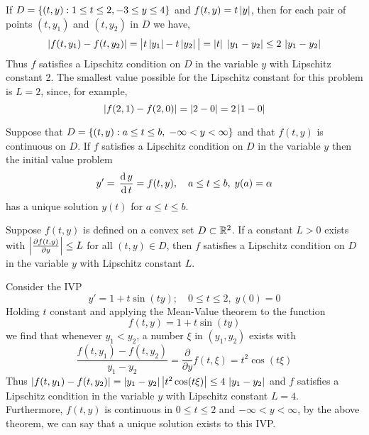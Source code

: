 \documentclass[../main-sheet.tex]{subfiles}
\begin{document}
\begin{ex}
    If \(D=\left\{(t,y):1\leq t\leq 2, -3\leq y\leq 4\right\}\) and \(f(t,y)=t\left\vert y\right\vert\), then for each pair of points \((t,y_1)\) and \((t,y_2)\) in \(D\) we have,
    \[
        \left\vert f(t,y_1)-f(t,y_2)\right\vert=\big\vert t\left\vert y_1\right\vert-t\left\vert y_2\right\vert\big\vert=\left\vert t\right\vert\;\left\vert y_1-y_2\right\vert\leq 2\,\left\vert y_1-y_2\right\vert
    \]
    Thus \(f\) satisfies a Lipschitz condition on \(D\) in the variable \(y\) with Lipschitz constant 2.
    The smallest value possible for the Lipschitz constant for this problem is \(L=2\), since, for example,
    \[
        \left\vert f(2,1)-f(2,0)\right\vert=\left\vert2-0\right\vert=2\left\vert1-0\right\vert
    \]
\end{ex}
\begin{thm}
    \label{thm:ivp1}
    Suppose that \(D=\left\{(t,y):a\leq t\leq b,\;-\infty<y<\infty\right\}\) and that \(f(t,y)\) is continuous on \(D\). If \(f\) satisfies a Lipschitz condition on \(D\) in the variable \(y\) then the initial value problem
    \[
        y'=\,\frac{\mathrm{d}\,y}{\mathrm{d}\,t}=f(t,y),\quad a\leq t\leq b,\;y(a)=\alpha
    \]
    has a unique solution \(y(t)\) for \(a\leq t\leq b\).
\end{thm}
\begin{thm}
    Suppose \(f(t,y)\) is defined on a convex set \(D\subset \mathbb{R}^2\). If a constant \(L>0\) exists with \(\left\vert\frac{\partial f(t,y)}{\partial y}\right\vert\leq L\) for all \((t,y)\in D\), then \(f\) satisfies a Lipschitz condition on \(D\) in the variable \(y\) with Lipschitz constant \(L\).
\end{thm}
\begin{ex}
    Consider the IVP
    \[
        y'=1+t\sin(ty);\quad 0\leq t\leq 2,\;y(0)=0
        \]
    Holding \(t\) constant and applying the Mean-Value theorem to the function
    \[
        f(t,y)=1+t\sin(ty)
        \]
        we find that whenever \(y_1< y_2\), a number \(\xi\) in \((y_1,y_2)\) exists with
        \[
        \frac{f(t,y_1)-f(t,y_2)}{y_1-y_2}=\frac{\partial}{\partial y}f(t,\xi)=t^2 \cos(t\xi)
    \]
    Thus \( \left\vert f(t,y_1)-f(t,y_2)\right\vert=\left\vert y_1-y_2\right\vert\left\vert t^2 \cos(t\xi)\right\vert\leq 4\,\left\vert y_1-y_2\right\vert\) and \(f\) satisfies a Lipschitz condition in the variable \(y\) with Lipschitz constant \(L=4\).\\
    Furthermore, \(f(t,y)\) is continuous in \(0\leq t\leq 2\) and \(-\infty < y<\infty\), by the above theorem, we can say that a unique solution exists to this IVP.
\end{ex}
\end{document}
